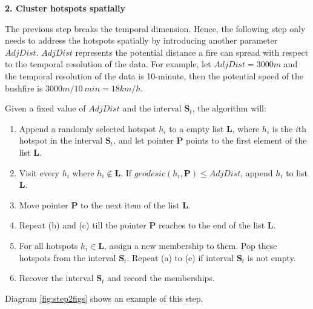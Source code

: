\textbf{2. Cluster hotspots spatially}

The previous step breaks the temporal dimension. Hence, the following
step only needs to address the hotspots spatially by introducing another
parameter \(AdjDist\). \(AdjDist\) represents the potential distance a
fire can spread with respect to the temporal resolution of the data. For
example, let \(AdjDist = 3000 m\) and the temporal resolution of the
data is 10-minute, then the potential speed of the bushfire is
\(3000m/10~min = 18km/h\).

Given a fixed value of \(AdjDist\) and the interval
\(\boldsymbol{S}_t\), the algorithm will:

\begin{enumerate}
\def\labelenumi{(\alph{enumi})}
\item
  Append a randomly selected hotspot \(h_i\) to a empty list
  \(\boldsymbol{L}\), where \(h_i\) is the \(i\)th hotspot in the
  interval \(\boldsymbol{S}_t\), and let pointer \(\boldsymbol{P}\)
  points to the first element of the list \(\boldsymbol{L}\).
\item
  Visit every \(h_i\) where \(h_i \notin \boldsymbol{L}\). If
  \(geodesic(h_i, \boldsymbol{P})\leq AdjDist\), append \(h_i\) to list
  \(\boldsymbol{L}\).
\item
  Move pointer \(\boldsymbol{P}\) to the next item of the list
  \(\boldsymbol{L}\).
\item
  Repeat (b) and (c) till the pointer \(\boldsymbol{P}\) reaches to the
  end of the list \(\boldsymbol{L}\).
\item
  For all hotspots \(h_i \in \boldsymbol{L}\), assign a new membership
  to them. Pop these hotspots from the interval \(\boldsymbol{S}_t\).
  Repeat (a) to (e) if interval \(\boldsymbol{S}_t\) is not empty.
\item
  Recover the interval \(\boldsymbol{S}_t\) and record the memberships.
\end{enumerate}

Diagram \ref{fig:step2figs} shows an example of this step.

